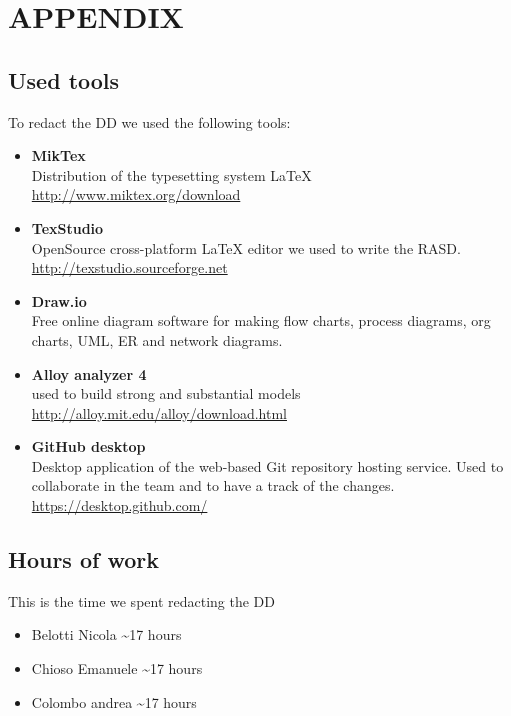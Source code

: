 \section{APPENDIX}
\subsection{Used tools}
To redact the DD we used the following tools:
\begin{itemize}
	\item \textbf{MikTex} \\ Distribution of the typesetting system LaTeX \\ \url{http://www.miktex.org/download } 
	\item \textbf{TexStudio}\\ OpenSource cross-platform LaTeX editor we used to write the RASD. \\ \url{http://texstudio.sourceforge.net  } 
	\item \textbf{Draw.io} \\ Free online diagram software for making flow charts, process diagrams, org charts, UML, ER and network diagrams.
	\item \textbf{Alloy analyzer 4}\\ used to build  strong and substantial models \\ \url{ http://alloy.mit.edu/alloy/download.html }
	\item \textbf{GitHub desktop}\\ Desktop application of the web-based Git repository hosting service. Used to collaborate in the team and to have a track of the changes.  \\ \url{https://desktop.github.com/ } 
\end{itemize}

\subsection{Hours of work}
This is the time we spent redacting the DD
\begin{itemize}
	\item {Belotti Nicola} \textasciitilde 17 hours
	\item {Chioso Emanuele} \textasciitilde 17 hours
	\item {Colombo andrea} \textasciitilde 17 hours
\end{itemize}